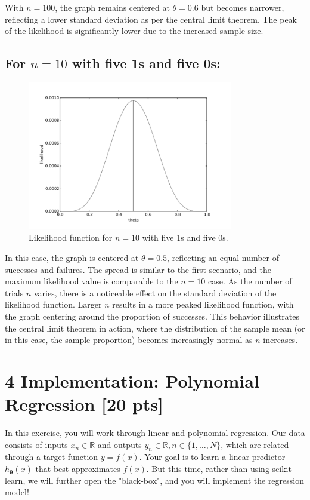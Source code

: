 \documentclass[10pt]{article}
\begin{document}
With \( n = 100 \), the graph remains centered at \( \theta = 0.6 \) but becomes narrower, reflecting a lower standard deviation as per the central limit theorem. The peak of the likelihood is significantly lower due to the increased sample size.

\subsection*{For \( n = 10 \) with five 1s and five 0s:}
\begin{figure}[h!]
  \centering
  \includegraphics[width=0.8\textwidth]{image3.png}
  \caption{Likelihood function for \( n = 10 \) with five 1s and five 0s.}
\end{figure}

In this case, the graph is centered at \( \theta = 0.5 \), reflecting an equal number of successes and failures. The spread is similar to the first scenario, and the maximum likelihood value is comparable to the \( n = 10 \) case. As the number of trials \( n \) varies, there is a noticeable effect on the standard deviation of the likelihood function. Larger \( n \) results in a more peaked likelihood function, with the graph centering around the proportion of successes. This behavior illustrates the central limit theorem in action, where the distribution of the sample mean (or in this case, the sample proportion) becomes increasingly normal as \( n \) increases.


\section*{4 Implementation: Polynomial Regression [20 pts]}
In this exercise, you will work through linear and polynomial regression. Our data consists of inputs $x_{n} \in \mathbb{R}$ and outputs $y_{n} \in \mathbb{R}, n \in\{1, \ldots, N\}$, which are related through a target function $y=f(x)$. Your goal is to learn a linear predictor $h_{\boldsymbol{\theta}}(x)$ that best approximates $f(x)$. But this time, rather than using scikit-learn, we will further open the "black-box", and you will implement the regression model!
\end{document}
